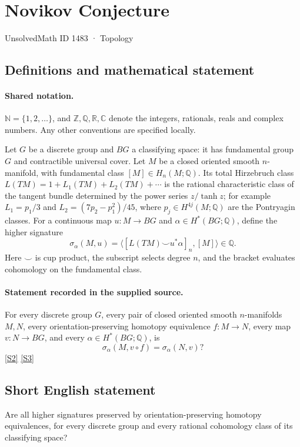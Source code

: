 \documentclass[11pt]{article}
\newcommand{\sref}[2]{\hyperlink{source:#1:#2}{[S#2]}}
\begin{document}
\setcounter{section}{1482}
\section{Novikov Conjecture}\label{1483}
{\small\sffamily UnsolvedMath ID 1483 · Topology}
\subsection{Definitions and mathematical statement}

\paragraph{Shared notation.}$\mathbb N=\{1,2,\ldots\}$, and $\mathbb Z,\mathbb Q,\mathbb R,\mathbb C$ denote the integers, rationals, reals and complex numbers. Any other conventions are specified locally.


Let \(G\) be a discrete group and \(BG\) a classifying space:
it has fundamental group \(G\) and contractible universal cover.
Let \(M\) be a closed oriented smooth \(n\)-manifold, with fundamental
class \([M]\in H_n(M;\mathbb Q)\). Its total Hirzebruch class
\(L(TM)=1+L_1(TM)+L_2(TM)+\cdots\) is the rational characteristic
class of the tangent bundle determined by the power series \(z/\tanh z\);
for example \(L_1=p_1/3\) and \(L_2=(7p_2-p_1^2)/45\), where
\(p_j\in H^{4j}(M;\mathbb Q)\) are the Pontryagin classes.
For a continuous map \(u:M\to BG\) and
\(\alpha\in H^*(BG;\mathbb Q)\), define the higher signature
\[
 \sigma_\alpha(M,u)=\bigl\langle
       [L(TM)\smile u^*\alpha]_n,[M]\bigr\rangle\in\mathbb Q.
\]
Here \(\smile\) is cup product, the subscript selects degree \(n\),
and the bracket evaluates cohomology on the fundamental class.
\paragraph{Statement recorded in the supplied source.}
For every discrete group \(G\), every pair of closed oriented smooth
\(n\)-manifolds \(M,N\), every orientation-preserving homotopy equivalence
\(f:M\to N\), every map \(v:N\to BG\), and every
\(\alpha\in H^*(BG;\mathbb Q)\), is
\[
 \sigma_\alpha(M,v\circ f)=\sigma_\alpha(N,v)?
\] \sref{1483}{2} \sref{1483}{3}
\subsection{Short English statement}
Are all higher signatures preserved by orientation-preserving homotopy equivalences, for every discrete group and every rational cohomology class of its classifying space?
\end{document}
